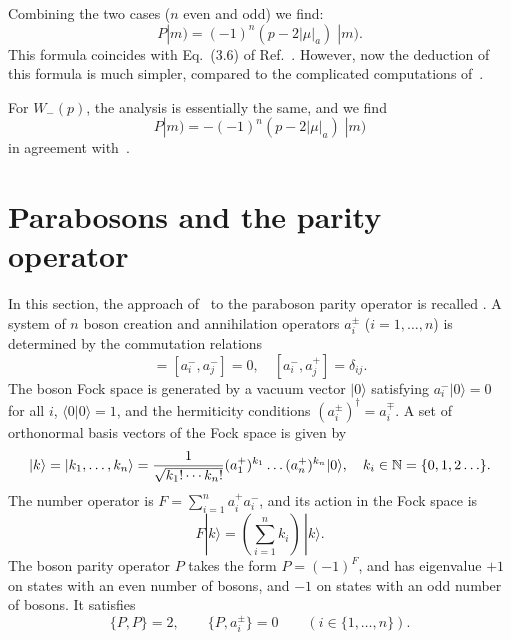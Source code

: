 \documentclass{SciPost}
\begin{document}
Combining the two cases ($n$ even and odd) we find:
\begin{equation}
P |m) = (-1)^n (p-2|\mu|_a) \; |m).
\label{P+-eigenvalue}
\end{equation}
This formula coincides with Eq.~(3.6) of Ref.~\cite{SV2026}. 
However, now the deduction of this formula is much simpler, compared to the complicated computations of~\cite{SV2026}.

For $W_-(p)$, the analysis is essentially the same, and we find
\begin{equation}
P |m) = -(-1)^n (p-2|\mu|_a) \; |m)
\label{P--eigenvalue}
\end{equation}
in agreement with~\cite[Eq.~(3.7)]{SV2026}.

\setcounter{equation}{0}
\section{Parabosons and the parity operator}
\label{sec5}

In this section, the approach of~\cite{SV2026} to the paraboson parity operator is recalled .
A system of $n$ boson creation and annihilation operators $a_i^\pm$ ($i=1,\ldots,n$) is determined by the commutation relations
\begin{equation}
 [ a_i^+,a_j^+] = [ a_i^-,a_j^-] = 0, \quad [ a_i^-,a_j^+] = \delta_{ij}.
\label{1-aa}
\end{equation}
The boson Fock space is generated by a vacuum vector $|0\rangle$ satisfying
$a_i^- |0\rangle =0$ for all $i$, $\langle 0 | 0\rangle = 1$,
and the hermiticity conditions $(a_i^\pm)^\dagger = a_i^\mp$.
A set of orthonormal basis vectors of the Fock space is given by
\begin{equation}
|k\rangle = |k_1,\ldots,k_n\rangle= \frac{1}{\sqrt{k_1!\cdots k_n!}}(a_1^+)^{k_1}\ldots (a_n^+)^{k_n} |0\rangle,
\quad k_i\in{\mathbb N}=\{ 0,1,2\ldots \}.
\label{k}
\end{equation}
The number operator is $F=\sum_{i=1}^n a_i^+a_i^-$, and its action in the Fock space is
\begin{equation}
F |k\rangle = (\sum_{i=1}^n k_i)\, |k\rangle.
\end{equation}
The boson parity operator $P$ takes the form $P=(-1)^F$,
and has eigenvalue $+1$ on states with an even number of bosons, 
and $-1$ on states with an odd number of bosons.
It satisfies
\begin{equation}
\{P,P\}=2,\qquad \{ P, a_i^\pm \} =0\qquad (i\in \{1,\ldots,n\}).
\label{1-ha}
\end{equation}
\end{document}
